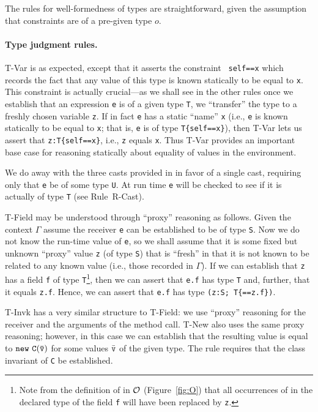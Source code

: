 The rules for well-formedness of types are straightforward, given 
the assumption that constraints are of a pre-given type $o$.

\paragraph{Type judgment rules.}
{\sc T-Var} is as expected, except that it asserts the constraint {\tt
self==x} which records the fact that any value of this type is known
statically to be equal to {\tt x}. This constraint is actually 
crucial---as we shall see in the other rules once we establish that
an expression {\tt e} is of a given type {\tt T}, we ``transfer'' the
type to a freshly chosen variable {\tt z}. If in fact {\tt e} has a
static ``name'' {\tt x} (i.e., {\tt e} is known statically to be
equal to {\tt x}; that is, {\tt e} is of type {\tt T\{self==x\}}), then
{\sc T-Var} lets us assert that {\tt z:T\{self==x\}}, i.e., {\tt z}
equals {\tt x}. Thus {\sc T-Var} provides an important base case for
reasoning statically about equality of values in the environment.

We do away with the three casts provided in \FJ{} in favor of a single
cast, requiring only that {\tt e} be of some type {\tt U}. At run time
{\tt e} will be checked to see if it is actually of type {\tt T} (see
Rule~{\sc R-Cast}).

{\sc T-Field} may be understood through ``proxy'' reasoning as
follows.  Given the context $\Gamma$ assume the receiver {\tt e} can
be established to be of type {\tt S}. Now we do not know the run-time
value of {\tt e}, so we shall assume that it is some fixed but unknown
``proxy'' value {\tt z} (of type {\tt S}) that is ``fresh'' in that it
is not known to be related to any known value (i.e., those recorded
in $\Gamma$).  If we can establish that {\tt z} has a field {\tt f} of
type {\tt T}\footnote{Note from the definition of \fields{} in
${\cal O}$ (Figure~\ref{fig:O}) that all occurrences of \this{}
in the declared type of the field {\tt f} will have been
replaced by {\tt z}.}, then we can assert that {\tt e.f} has
type {\tt T} and, further, that it equals {\tt z.f}.  Hence, we
can assert that {\tt e.f} has type {\tt (z:S;\,T\{\self==z.f\})}.

{\sc T-Invk} has a very similar structure to {\sc T-Field}: we use
``proxy'' reasoning for the receiver and the arguments of the method
call. {\sc T-New} also uses the same proxy reasoning; however, in this case
we can establish that the resulting value is equal to ${\tt new\ C(\bar{\tt v})}$
for some values $\bar{\tt v}$ of the given type.  The rule
requires that the class invariant of {\tt C} be established.

